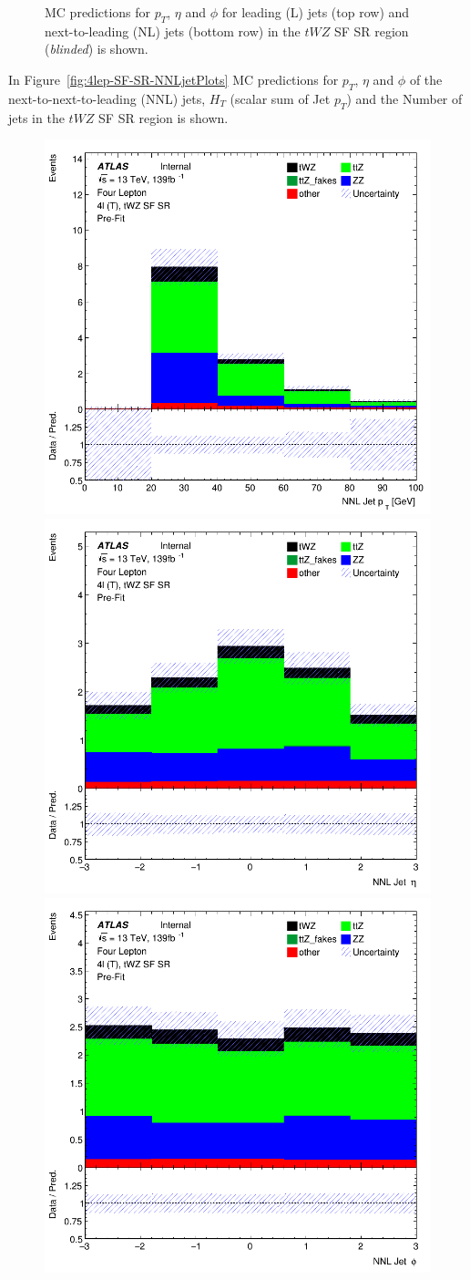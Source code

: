 \begin{figure}[htbp]
\begin{tabular}{ccc}
  \end{tabular}
    \caption{MC predictions for $p_{T}$, $\eta$ and $\phi$ for leading (L) jets (top row) and next-to-leading (NL) jets (bottom row) in the $tWZ$ SF SR region (\textit{blinded}) is shown.}
    \label{fig:4lep-SF-SR-LandNjetPlots} 
\end{figure}

In Figure~\ref{fig:4lep-SF-SR-NNLjetPlots} MC predictions for $p_{T}$, $\eta$ and $\phi$ of the next-to-next-to-leading (NNL) jets, $H_{T}$ (scalar sum of Jet $p_{T}$) and the Number of jets in the $tWZ$ SF SR region is shown.


\begin{figure}[htbp]
 \centering


    \includegraphics[width=.3\textwidth]{figures/PreFitPlots/lep4_tWZ_4T_SF_NNLJet_pt.png} \quad
    \includegraphics[width=.3\textwidth]{figures/PreFitPlots/lep4_tWZ_4T_SF_NNLJet_eta.png} \quad
    \includegraphics[width=.3\textwidth]{figures/PreFitPlots/lep4_tWZ_4T_SF_NNLJet_phi.png}

    \medskip


\end{figure}
